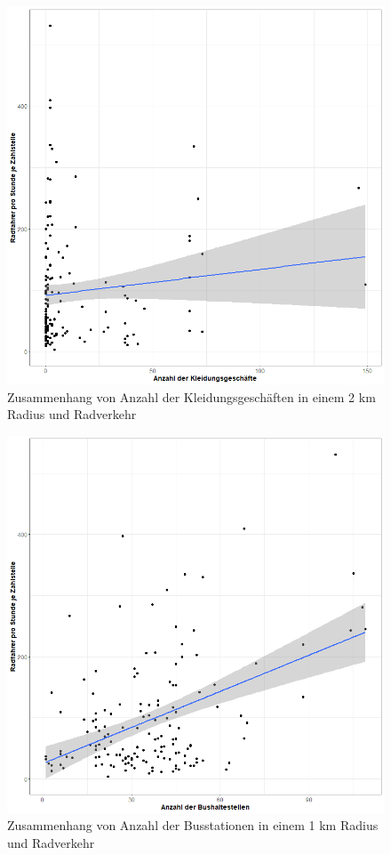 \documentclass[a4paper,12pt]{thesis}
\begin{document}
\begin{figure}[!ht]
	\centering
	\includegraphics[width=\textwidth]{Plots/plot15.png}
	\caption{Zusammenhang von Anzahl der Kleidungsgeschäften in einem 2 km Radius und Radverkehr}
	\label{ClothesShop}
\end{figure}

\begin{figure}[!ht]
	\centering
	\includegraphics[width=\textwidth]{Plots/plot16.png}
	\caption{Zusammenhang von Anzahl der Busstationen in einem 1 km Radius und Radverkehr}
	\label{BusStops}
\end{figure}
\end{document}
